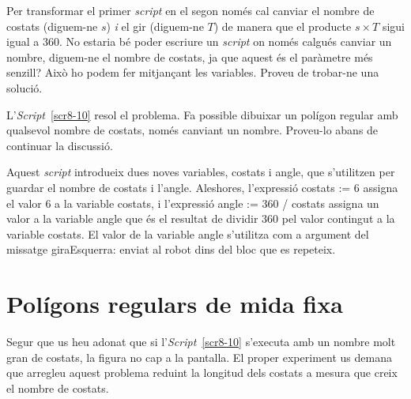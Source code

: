 Per transformar el primer \emph{script} en el segon només cal canviar el nombre de costats (diguem-ne $s$) \emph{i} el gir (diguem-ne $T$) de manera que el producte $s \times T$ sigui igual a 360. No estaria bé poder escriure un \emph{script} on només calgués canviar un nombre, diguem-ne el nombre de costats, ja que aquest és el paràmetre més senzill? Això ho podem fer mitjançant les variables. Proveu de trobar-ne una solució. 

L'\emph{Script}~\ref{scr8-10} resol el problema. Fa possible dibuixar un polígon regular amb qualsevol nombre de costats, només canviant un nombre. Proveu-lo abans de continuar la discussió.

Aquest \emph{script} introdueix dues noves variables, \textsf{costats} i \textsf{angle}, que s'utilitzen per guardar el nombre de costats i l'angle.
Aleshores, l'expressió \textsf{costats := 6} assigna el valor \textsf{6} a la variable \textsf{costats}, i l'expressió \textsf{angle := 360 / costats} assigna un valor a la variable \textsf{angle} que és el resultat de dividir 360 pel valor contingut a la variable \textsf{costats}. El valor de la variable \textsf{angle} s'utilitza com a argument del missatge \textsf{giraEsquerra:} enviat al robot dins del bloc que es repeteix.  

\section{Polígons regulars de mida fixa}
Segur que us heu adonat que si l'\emph{Script}~\ref{scr8-10} s'executa amb un nombre molt gran de costats, la figura no cap a la pantalla.
El proper experiment us demana que arregleu aquest problema reduint la longitud dels costats a mesura que creix el nombre de costats.

